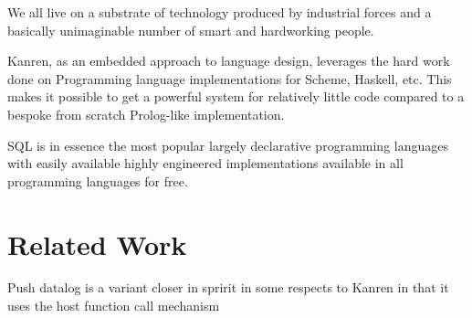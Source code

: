 We all live on a substrate of technology produced by industrial forces 
and a basically unimaginable number of smart and hardworking people.

Kanren, as an embedded approach to language design,
leverages the hard work done on Programming language implementations for Scheme, Haskell, 
etc. This makes it possible to get a powerful system for relatively little code compared
to a bespoke from scratch Prolog-like implementation. 

SQL is in essence the most popular largely declarative programming languages
with easily available highly engineered implementations available in all programming languages
for free.

\cite{hytradboi}
\cite{Kiselyov}










\section{Related Work}

Push datalog is a variant closer in spririt in some respects to Kanren in that it uses the host function call mechanism



%

\cite{https://www.philipzucker.com/notes/Languages/datalog/}

\cite{oatlog}
\cite{yihong egglite}